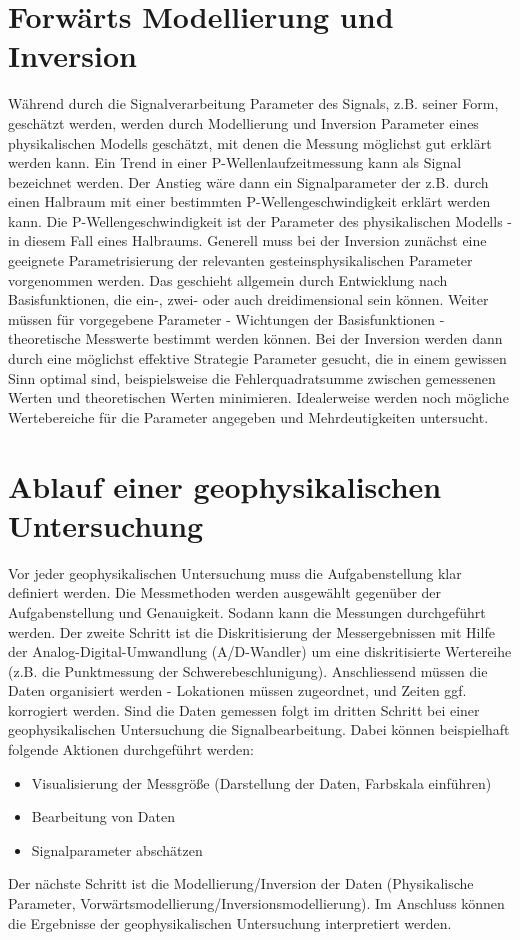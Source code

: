 \section{Forwärts Modellierung und Inversion}
Während durch die Signalverarbeitung Parameter des Signals, z.B. seiner Form, geschätzt werden, werden durch Modellierung und Inversion Parameter eines phy\-sikalischen Modells geschätzt, mit denen die Messung möglichst gut erklärt werden kann. Ein Trend in einer P-Wellenlaufzeitmessung kann als Signal bezeichnet werden. Der Anstieg wäre dann ein Signalparameter der z.B. durch einen Halbraum mit einer bestimmten P-Wellengeschwindigkeit erklärt werden kann. Die P-Wellengeschwindigkeit ist der Parameter des physikalischen Modells - in diesem Fall eines Halbraums. Generell muss bei der Inversion zunächst eine geeignete Parametrisierung der relevanten gesteinsphysikalischen Parameter vorgenommen werden. Das geschieht allgemein durch Entwicklung nach Basisfunktionen, die ein-, zwei- oder auch dreidimensional sein können.  Weiter müssen für vorgegebene Parameter - Wichtungen der Basisfunktionen - theoretische Messwerte bestimmt werden können. Bei der Inversion werden dann durch eine möglichst effektive Strategie Parameter gesucht, die in einem gewissen Sinn optimal sind, beispielsweise die Fehlerquadratsumme zwischen gemessenen Werten und theoretischen Werten minimieren. Idealerweise werden noch mögliche Wertebereiche für die Parameter angegeben und Mehrdeutigkeiten untersucht.  

\section{Ablauf einer geophysikalischen Untersuchung}
Vor jeder geophysikalischen Untersuchung muss die Aufgabenstellung klar definiert werden. Die Messmethoden werden ausgewählt gegenüber der Aufgabenstellung und Genauigkeit. Sodann kann die Messungen durchgeführt werden.
Der zweite Schritt ist die Diskritisierung der Messergebnissen mit Hilfe der Analog-Digital-Umwandlung (A/D-Wandler) um eine diskritisierte Wertereihe (z.B. die Punktmessung der Schwerebeschlunigung). Anschliessend müssen die Daten organisiert werden - Lokationen müssen zugeordnet, und Zeiten ggf. korrogiert werden. Sind die Daten gemessen folgt im dritten Schritt bei einer geophysikalischen Untersuchung die Signalbearbeitung. Dabei können beispielhaft folgende Aktionen durchgeführt werden: 
\begin{itemize}
\item Visualisierung der Messgröße (Darstellung der Daten, Farbskala einführen)
\item Bearbeitung von Daten
\item Signalparameter abschätzen
\end{itemize}
Der nächste Schritt ist die Modellierung/Inversion der Daten (Physikalische Parameter, Vorwärtsmodellierung/Inversionsmodellierung). Im Anschluss können die Ergebnisse der geophysikalischen Untersuchung interpretiert werden.

